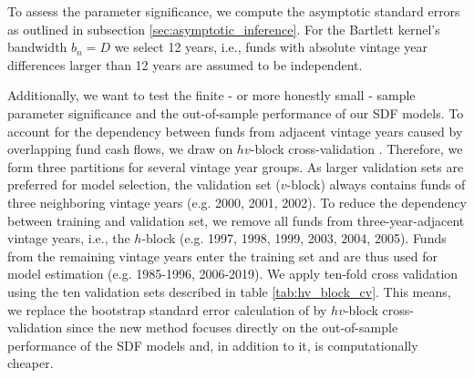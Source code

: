 \documentclass[12pt]{article}
\begin{document}
To assess the parameter significance, we compute the asymptotic standard errors as outlined in subsection \ref{sec:asymptotic_inference}.
For the Bartlett kernel's bandwidth $b_n=D$ we select 12 years, i.e., funds with absolute vintage year differences larger than 12 years are assumed to be independent.

Additionally, we want to test the finite - or more honestly small - sample parameter significance and the out-of-sample performance of our SDF models.
To account for the dependency between funds from adjacent vintage years caused by overlapping fund cash flows, we draw on $hv$-block cross-validation \citep{R00}.
Therefore, we form three partitions for several vintage year groups.
As larger validation sets are preferred for model selection, the validation set ($v$-block) always contains funds of three neighboring vintage years (e.g. 2000, 2001, 2002).
To reduce the dependency between training and validation set, we remove all funds from three-year-adjacent vintage years, i.e., the $h$-block (e.g. 1997, 1998, 1999, 2003, 2004, 2005).
Funds from the remaining vintage years enter the training set and are thus used for model estimation (e.g. 1985-1996, 2006-2019).
We apply ten-fold cross validation using the ten validation sets described in table \ref{tab:hv_block_cv}.
This means, we replace the bootstrap standard error calculation of \cite{DLP12} by $hv$-block cross-validation since the new method focuses directly on the out-of-sample performance of the SDF models and, in addition to it, is computationally cheaper.
\end{document}
